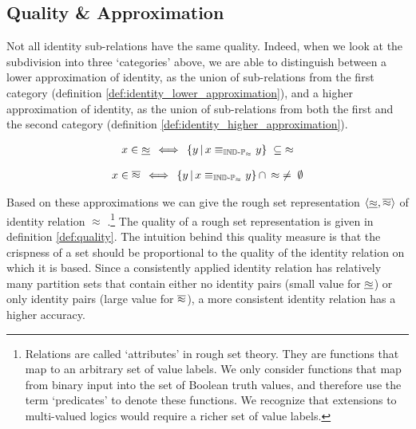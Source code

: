 \subsection{Quality \& Approximation}
\label{sec:approximation}

Not all identity sub-relations have the same quality.
Indeed, when we look at the subdivision into three `categories' above,
  we are able to distinguish between a lower approximation of identity,
  as the union of sub-relations from the first category
  (definition \ref{def:identity_lower_approximation}),
  and a higher approximation of identity,
  as the union of sub-relations from both the first and the second category
  (definition \ref{def:identity_higher_approximation}).

\begin{definition}
\label{def:identity_lower_approximation}
\begin{align}
  x \in \underline{\approx}
\, \iff \,
    \{y\,\vert\,x \equiv_{\operatorname{{\mathbb{IND}-\mathbb{P}}}_{\approx}} y\}
  \; \subseteq \;
    \approx\nonumber
\end{align}
\end{definition}

\begin{definition}
\label{def:identity_higher_approximation}
\begin{align}
  x \in \overline{\approx}
\, \iff \,
      \{y\,\vert\,x \equiv_{\operatorname{{\mathbb{IND}-\mathbb{P}}}_{\approx}} y\}
    \, \cap \,
      \approx
  \; \neq \;
    \emptyset\nonumber
\end{align}
\end{definition}

\noindent Based on these approximations we can give
  the rough set representation $\langle\underline{\approx},\overline{\approx}\rangle$
  of identity relation $\approx$ \cite{Pawlak1991}.\footnote{
    Relations are called `attributes' in rough set theory.
    They are functions that map to an arbitrary set of value labels.
    We only consider functions that map from binary input into
      the set of Boolean truth values, and therefore use the term
     `predicates' to denote these functions.
    We recognize that extensions to multi-valued logics
      would require a richer set of value labels.
  }
The quality of a rough set representation is given in
  definition \ref{def:quality}.
The intuition behind this quality measure is that the crispness
  of a set should be proportional to the quality
  of the identity relation on which it is based.
Since a consistently applied identity relation has relatively many
  partition sets that contain either
  no identity pairs (small value for $\underline{\approx}$) or
  only identity pairs (large value for $\overline{\approx}$),
  a more consistent identity relation has a higher accuracy.

